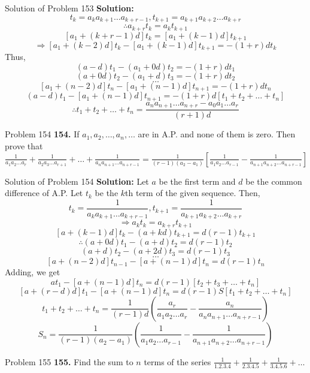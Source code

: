 \documentclass[aspectratio=1610,8pt]{beamer}
\begin{document}
\begin{frame}{Solution of Problem 153}
  \textbf{Solution:} $$t_k = a_ka_{k+1}\ldots a_{k + r - 1}, t_{k+1} = a_{k+1}a_{k+2}\ldots a_{k+r}$$
  $$\therefore a_{k+r}t_k = a_kt_{k+1}$$
  $$[a_1 + (k + r - 1)d]t_k = [a_1 + (k - 1)d]t_{k + 1}$$
  $$\Rightarrow [a_1 + (k - 2)d]t_k - [a_1 + (k - 1)d]t_{k + 1} = -(1 + r)dt_k$$
  Thus,
  $$(a - d)t_1 - (a_1 + 0d)t_2 = -(1 + r)dt_1$$
  $$(a + 0d)t_2 - (a_1 + d)t_3 = -(1 + r)dt_2$$
  $$\ldots$$
  $$[a_1 + (n - 2)d]t_n - [a_1 + (n - 1)d]t_{n+1} = -(1 + r)dt_n$$
  $$(a - d)t_1 - [a_1 + (n - 1)d]t_{n + 1} = -(1 + r)d[t_1 + t_2 + \ldots + t_n]$$
  $$\therefore t_1 + t_2 + \ldots + t_n = \frac{a_na_{n + 1}\ldots a_{n +r} - a_0a_1\ldots a_r}{(r + 1)d}$$
\end{frame}
\begin{frame}{Problem 154}
  \textbf{154.} If $a_1, a_2, \ldots, a_n, \ldots$ are in A.P. and none of them is zero. Then prove that $\frac{1}{a_1a_2\ldots
    a_r} + \frac{1}{a_2a_3\ldots a_{r + 1}} + \ldots + \frac{1}{a_na_{n + 1}\ldots a_{n + r - 1}} = \frac{1}{(r - 1)(a_2 -
    a_1)}\left[\frac{1}{a_1a_2\ldots a_{r - 1}} - \frac{1}{a_{n + 1}a_{n + 2}\ldots a_{n + r - 1}}\right]$
\end{frame}
\begin{frame}{Solution of Problem 154}
  \textbf{Solution:} Let $a$ be the first term and $d$ be the common difference of A.P. Let $t_k$ be the $k$th term of the given
  sequence. Then,
  $$t_k = \frac{1}{a_ka_{k + 1}\ldots a_{k + r - 1}}, t_{k + 1} = \frac{1}{a_{k + 1}a_{k + 2}\ldots a_{k + r}}$$
  $$\Rightarrow a_kt_k = a_{k+r}t_{k + 1}$$
  $$[a + (k - 1)d]t_k - (a + kd)t_{k + 1} = d(r - 1)t_{k + 1}$$
  $$\therefore (a + 0d)t_1 - (a + d)t_2 = d(r - 1)t_2$$
  $$(a + d)t_2 - (a + 2d)t_3 = d(r - 1)t_3$$
  $$\ldots$$
  $$[a + (n - 2)d]t_{n - 1} - [a + (n - 1)d]t_n = d(r - 1)t_n$$
  Adding, we get
  $$at_1 - [a + (n - 1)d]t_n = d(r - 1)[t_2 + t_3 + \ldots + t_n]$$
  $$[a + (r - d)d]t_1 - [a + (n - 1)d]t_n = d(r - 1)S[t_1 + t_2 + \ldots + t_n]$$
  $$t_1 + t_2 + \ldots + t_n = \frac{1}{(r - 1)d}\left(\frac{a_r}{a_1a_2\ldots a_r} - \frac{a_n}{a_na_{n + 1}\ldots a_{n + r -
      1}}\right)$$
  $$S_n = \frac{1}{(r - 1)(a_2 - a_1)}\left(\frac{1}{a_1a_2\ldots a_{r - 1}} - \frac{1}{a_{n + 1}a_{n + 2}\ldots a_{n + r -
      1}}\right)$$
\end{frame}
\begin{frame}{Problem 155}
  \textbf{155.} Find the sum to $n$ terms of the series $\frac{1}{1.2.3.4} + \frac{1}{2.3.4.5} + \frac{1}{3.4.5.6} + \ldots$
\end{frame}
\end{document}
